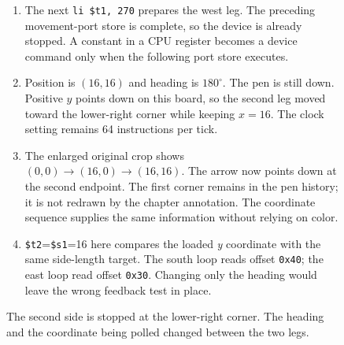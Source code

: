 \begin{figure}[htbp]
  \par\smallskip
  \begin{minipage}{\linewidth}
    \small
    \begin{enumerate}
      \item The next \texttt{li \$t1, 270} prepares the west leg. The preceding movement-port store is complete, so the device is already stopped. A constant in a CPU register becomes a device command only when the following port store executes.
      \item Position is $(16,16)$ and heading is $180^\circ$. The pen is still down. Positive $y$ points down on this board, so the second leg moved toward the lower-right corner while keeping $x=16$. The clock setting remains 64 instructions per tick.
      \item The enlarged original crop shows $(0,0)\rightarrow(16,0)\rightarrow(16,16)$. The arrow now points down at the second endpoint. The first corner remains in the pen history; it is not redrawn by the chapter annotation. The coordinate sequence supplies the same information without relying on color.
      \item \texttt{\$t2}=\texttt{\$s1}=16 here compares the loaded \emph{y} coordinate with the same side-length target. The south loop reads offset \texttt{0x40}; the east loop read offset \texttt{0x30}. Changing only the heading would leave the wrong feedback test in place.
    \end{enumerate}
  \end{minipage}
  \caption{The second side is stopped at the lower-right corner. The heading and the coordinate being polled changed between the two legs.}
  \label{capture:006-marsbot-square-f02-south}
\end{figure}
\par
